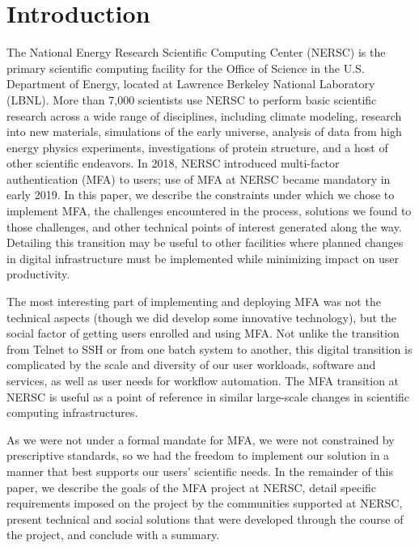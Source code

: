 \documentclass[sigconf,review]{acmart}
\begin{document}


\maketitle

\section{Introduction}
\label{intro}

The National Energy Research Scientific Computing Center (NERSC) is the primary
scientific computing facility for the Office of Science in the U.S. Department
of Energy, located at Lawrence Berkeley National Laboratory (LBNL). More than
7,000 scientists use NERSC to perform basic scientific
research across a wide range of disciplines, including climate modeling,
research into new materials, simulations of the early universe, analysis of data
from high energy physics experiments, investigations of protein structure, and a
host of other scientific endeavors. In 2018, NERSC introduced multi-factor
authentication (MFA) to users; use of MFA at NERSC became mandatory in early
2019. In this paper, we describe the constraints under which we chose to
implement MFA, the challenges encountered in the process, solutions we found to
those challenges, and other technical points of interest generated along the
way. Detailing this transition may be useful to other facilities where planned
changes in digital infrastructure must be implemented while minimizing impact on
user productivity.

The most interesting part of implementing and deploying MFA was not the
technical aspects (though we did develop some innovative technology), but the
social factor of getting users enrolled and using MFA. Not unlike the transition
from Telnet to SSH or from one batch system to another, this digital transition
is complicated by the scale and diversity of our user workloads, software and
services, as well as user needs for workflow automation. The MFA transition at
NERSC is useful as a point of reference in similar large-scale changes in
scientific computing infrastructures.

As we were not under a formal mandate for MFA, we were not constrained by
prescriptive standards, so we had the freedom to implement our solution in a
manner that best supports our users' scientific needs. In the remainder of this
paper, we describe the goals of the MFA project at NERSC, detail specific
requirements imposed on the project by the communities supported at NERSC,
present technical and social solutions that were developed through the course of
the project, and conclude with a summary.
\end{document}

